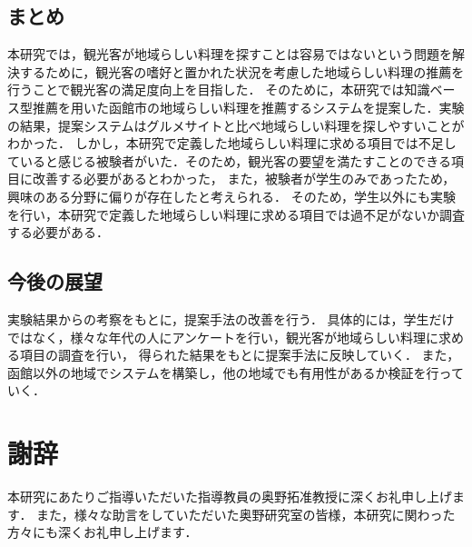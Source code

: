 \documentclass{funthesis}
\begin{document}
\section{まとめ}
本研究では，観光客が地域らしい料理を探すことは容易ではないという問題を解決するために，観光客の嗜好と置かれた状況を考慮した地域らしい料理の推薦を行うことで観光客の満足度向上を目指した．
そのために，本研究では知識ベース型推薦を用いた函館市の地域らしい料理を推薦するシステムを提案した．実験の結果，提案システムはグルメサイトと比べ地域らしい料理を探しやすいことがわかった．
しかし，本研究で定義した地域らしい料理に求める項目では不足していると感じる被験者がいた．そのため，観光客の要望を満たすことのできる項目に改善する必要があるとわかった，
また，被験者が学生のみであったため，興味のある分野に偏りが存在したと考えられる．
そのため，学生以外にも実験を行い，本研究で定義した地域らしい料理に求める項目では過不足がないか調査する必要がある．

\section{今後の展望}
実験結果からの考察をもとに，提案手法の改善を行う．
具体的には，学生だけではなく，様々な年代の人にアンケートを行い，観光客が地域らしい料理に求める項目の調査を行い，
得られた結果をもとに提案手法に反映していく．
また，函館以外の地域でシステムを構築し，他の地域でも有用性があるか検証を行っていく．

\chapter *{謝辞}
本研究にあたりご指導いただいた指導教員の奥野拓准教授に深くお礼申し上げます．
また，様々な助言をしていただいた奥野研究室の皆様，本研究に関わった方々にも深くお礼申し上げます．
\end{document}
